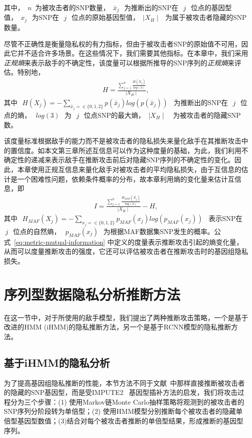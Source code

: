 其中，~$n$~为被攻击者的SNP数量，~$\bar{x}_j~$~为推断出的SNP在~$~j~$~位点的基因型值，~$\hat{x}_j~$~为SNP在~$~j~$~位点的原始基因型值，~$\mid X_H \mid~$~为属于被攻击者隐藏的SNP数量。

尽管不正确性是衡量隐私权的有力指标，但由于被攻击者SNP的原始值不可用，因此它并不适合许多场景。在这些情况下，我们需要其他指标。在本章中，我们采用\textit{正规熵}来表示敌手的不确定性，该度量可以根据所推导的SNP序列的\textit{正规熵}来评估。特别地，
\begin{align}\label{eq:metric-entropy}
H = \frac{\sum_{j=1}^n \frac{H(X_j)}{log(3)}}{\mid X_H \mid},
\end{align}
其中~$~H(X_j)= -\sum_{\bar{x}_j=\in \{0,1,2\}}{p(\bar{x}_j)log(p(\bar{x}_j))}$~ 为推断出的SNP在~$~j~$~位点的熵，~$~log(3)~$~为~$~j~$~位点SNP的最大熵，~$\mid X_H \mid~$~ 为被攻击者的隐藏SNP数。

该度量标准根据敌手的能力而不是被攻击者的隐私损失来量化敌手在其推断攻击中的置信度。如本文第三章所述互信息可以作为这种度量的基础，为此，我们利用不确定性的递减来表示敌手在推断攻击前后对隐藏SNP序列的不确定性的变化。因此，本章使用正规互信息来量化敌手对被攻击者的平均隐私损失，由于互信息的估计是一个困难性问题，依赖条件概率的分布，故本章利用熵的变化量来估计互信息，即
\begin{align}\label{eq:metric-mutual-information}
I = \frac{\sum_{j=1}^n \frac{H_{MAF}(X_j)}{log(3)}}{\mid X_H \mid}
- H,
\end{align}
其中~$~H_{MAF}(X_j) = -\sum_{x_j=\in \{0,1,2\}}{p_{MAF}(x_j)log(p_{MAF}(x_j))}$~ 表示SNP在~$~j~$~位点的自然熵，~$~p_{MAF}(x_j)~$~为根据MAF数据集SNP发生的概率。公式~\ref{eq:metric-mutual-information} 中定义的度量表示推断攻击引起的熵变化量，从而可以度量推断攻击的强度，它还可以评估被攻击者在推断攻击时的基因组隐私损失。

\section{序列型数据隐私分析推断方法}\label{sec:infer}

在这一节中，对于所使用的敌手模型，我们提出了两种推断攻击策略，一个是基于改进的HMM (iHMM)的隐私推断方法，另一个是基于RCNN模型的隐私推断方法。

\subsection{基于iHMM的隐私分析}

为了提高基因组隐私推断的性能，本节方法不同于文献~\cite{samani2015quantifying}中那样直接推断被攻击者的隐藏的SNP基因型，而是受IMPUTE2 ~\cite{howie2009flexible}基因型插补方法的启发，我们将攻击过程分为三个步骤：(1) 使用Markov链Monte Carlo抽样策略将观测到的被攻击者的SNP序列分阶段转为单倍型；(2) 使用HMM模型分别推断每个被攻击者的隐藏单倍型基因型数值；(3)结合对每个被攻击者推断的单倍型结果，形成推断的基因型序列。


